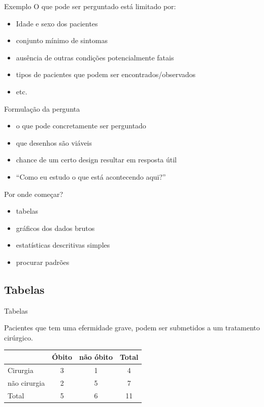 \documentclass{beamer}
\begin{document}
\begin{frame}{Exemplo}
  O que \alert{pode} ser perguntado está limitado por:
  \begin{itemize}
  \item Idade e sexo dos pacientes
  \item conjunto mínimo de sintomas
  \item ausência de outras condições potencialmente fatais
  \item tipos de pacientes que podem ser encontrados/observados
  \item etc.
  \end{itemize}
\end{frame}

\begin{frame}{Formulação da pergunta}
  \begin{itemize}
  \item o que pode concretamente ser perguntado
  \item que desenhos são viáveis
  \item chance de um certo design resultar em resposta útil
  \item ``Como eu estudo o que está acontecendo aqui?''
  \end{itemize}
\end{frame}

\begin{frame}{Por onde começar?}
  \begin{itemize}
  \item tabelas
  \item gráficos dos dados brutos
  \item estatísticas descritivas simples
  \item procurar padrões
  \end{itemize}
\end{frame}

\subsection{Tabelas}

\begin{frame}{Tabelas}
  \begin{example}
    Pacientes que tem uma efermidade grave, podem ser submetidos a um tratamento cirúrgico.

    \begin{tabular}{l|cc|c}
      &Óbito & não óbito & Total\\
      \hline
      Cirurgia & 3 & 1 & 4 \\
      não cirurgia & 2 & 5 & 7\\
      \hline
      Total & 5 & 6 & 11
    \end{tabular}
  \end{example}
\end{frame}
\end{document}
